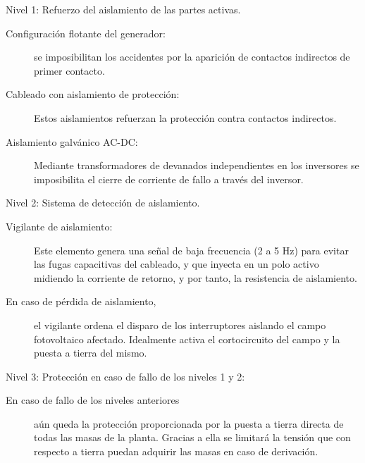\documentclass[aspectratio=169, usenames,svgnames,dvipsnames]{beamer}
\begin{document}
\begin{frame}[label={sec:org7ffbc95}]{Nivel 1: Refuerzo del aislamiento de las partes activas.}
\begin{description}
\item[{Configuración flotante del generador:}] se imposibilitan los
accidentes por la aparición de contactos indirectos de primer
contacto.

\item[{Cableado con aislamiento de protección:}] Estos aislamientos
refuerzan la protección contra contactos indirectos.

\item[{Aislamiento galvánico AC-DC:}] Mediante transformadores de devanados
independientes en los inversores se imposibilita el cierre de
corriente de fallo a través del inversor.
\end{description}
\end{frame}

\begin{frame}[label={sec:orgee0ee80}]{Nivel 2: Sistema de detección de aislamiento.}
\begin{description}
\item[{Vigilante de aislamiento:}] Este elemento genera una señal de baja
frecuencia (2 a 5 Hz) para evitar las fugas capacitivas del cableado,
y que inyecta en un polo activo midiendo la corriente de retorno, y
por tanto, la resistencia de aislamiento.

\item[{En caso de pérdida de aislamiento,}] el vigilante ordena el
disparo de los interruptores aislando el campo fotovoltaico
afectado. Idealmente activa el cortocircuito del campo y la puesta a
tierra del mismo.
\end{description}
\end{frame}

\begin{frame}[label={sec:org51b41dc}]{Nivel 3: Protección en caso de fallo de los niveles 1 y 2:}
\begin{description}
\item[{En caso de fallo de los niveles anteriores}] aún queda la
protección proporcionada por la puesta a tierra directa de todas las
masas de la planta. Gracias a ella se limitará la tensión que con
respecto a tierra puedan adquirir las masas en caso de derivación.
\end{description}
\end{frame}
\end{document}
